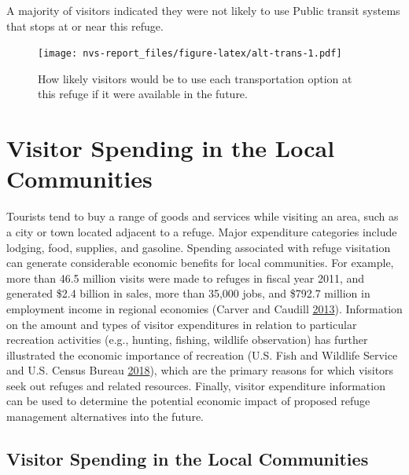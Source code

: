 \documentclass[]{book}
\let\BeginKnitrBlock\begin \let\EndKnitrBlock\end
\begin{document}
A majority of visitors indicated they were not likely to use Public
transit systems that stops at or near this refuge.

\begin{figure}
\centering
\texttt{[image: nvs-report\_files/figure-latex/alt-trans-1.pdf]}
\caption{\label{fig:alt-trans}How likely visitors would be to use each
transportation option at this refuge if it were available in the
future.}
\end{figure}

\chapter{Visitor Spending in the Local Communities}\label{econ}

\BeginKnitrBlock{preamble1}
Tourists tend to buy a range of goods and services while visiting an
area, such as a city or town located adjacent to a refuge. Major
expenditure categories include lodging, food, supplies, and gasoline.
Spending associated with refuge visitation can generate considerable
economic benefits for local communities. For example, more than 46.5
million visits were made to refuges in fiscal year 2011, and generated
\$2.4 billion in sales, more than 35,000 jobs, and \$792.7 million in
employment income in regional economies (Carver and Caudill
\protect\hyperlink{ref-carver2013}{2013}). Information on the amount and
types of visitor expenditures in relation to particular recreation
activities (e.g., hunting, fishing, wildlife observation) has further
illustrated the economic importance of recreation (U.S. Fish and
Wildlife Service and U.S. Census Bureau
\protect\hyperlink{ref-USFWS2018}{2018}), which are the primary reasons
for which visitors seek out refuges and related resources. Finally,
visitor expenditure information can be used to determine the potential
economic impact of proposed refuge management alternatives into the
future.
\EndKnitrBlock{preamble1}

\section{Visitor Spending in the Local
Communities}\label{visitor-spending-in-the-local-communities}
\end{document}

